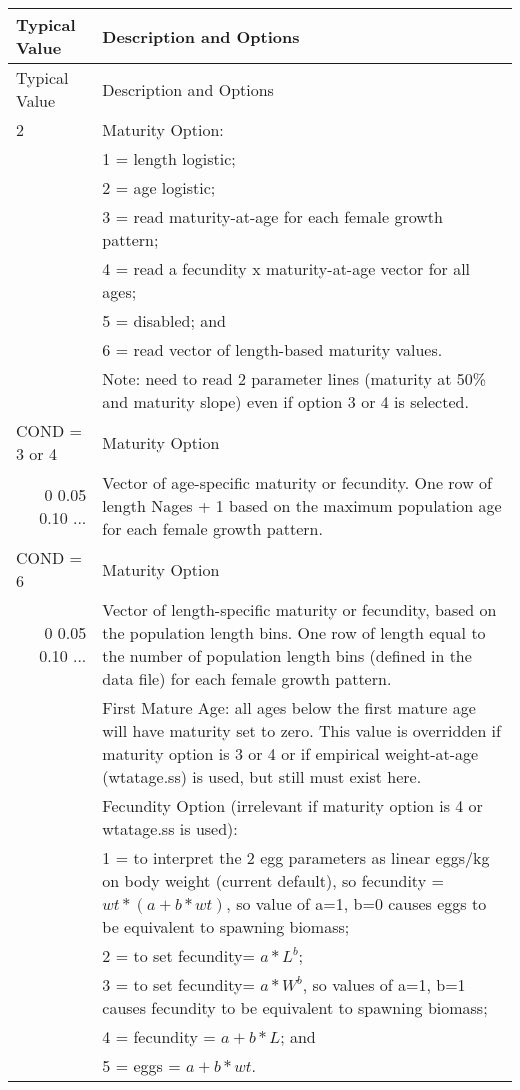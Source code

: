 \begin{longtable}{p{0.5cm} p{2cm} p{13cm}}
	\hline	
	\multicolumn{2}{l}{Typical Value} & Description and Options \Tstrut\Bstrut\\
	\hline
	\endfirsthead

	\hline
	\multicolumn{2}{l}{Typical Value} & Description and Options \Tstrut\Bstrut\\
	\hline
	\endhead
	\hline

	\endfoot
	
	\endlastfoot

	2 & & Maturity Option: \Tstrut\\
	  & & 1 = length logistic; \\
	  & & 2 = age logistic; \\
	  & & 3 = read maturity-at-age for each female growth pattern; \\
	  & & 4 = read a fecundity x maturity-at-age vector for all ages; \\
	  & & 5 = disabled; and \\
	  & & 6 = read vector of length-based maturity values. \\
	  & & Note: need to read 2 parameter lines (maturity at 50\% and maturity slope) even if option 3 or 4 is selected. \Bstrut\\
	\hline

	\multicolumn{2}{l}{COND = 3 or 4} & Maturity Option \Tstrut\\
	\multicolumn{2}{r}{0 0.05 0.10 ...} & Vector of age-specific maturity or fecundity. One row of length Nages + 1 based on the maximum population age for each female growth pattern. \Bstrut\\
	\multicolumn{2}{l}{COND = 6} & Maturity Option \Tstrut\\
	\multicolumn{2}{r}{0 0.05 0.10 ...} & Vector of length-specific maturity or fecundity, based on the population length bins. One row of length equal to the number of population length bins (defined in the data file) for each female growth pattern. \Bstrut\\
	\hline
	
	\Tstrut 1 & & First Mature Age: all ages below the first mature age will have maturity set to zero. This value is overridden if maturity option is 3 or 4 or if empirical weight-at-age (wtatage.ss) is used, but still must exist here. \Bstrut\\
	\hline

	\Tstrut 1 & & Fecundity Option (irrelevant if maturity option is 4 or wtatage.ss is used): \\
	  & & 1 = to interpret the 2 egg parameters as linear eggs/kg on body weight (current default), so fecundity = $wt * (a+b*wt)$, so value of a=1, b=0 causes eggs to be equivalent to spawning biomass; \\
	  & & 2 = to set fecundity= $a*L^ b$; \\
	  & & 3 = to set fecundity= $a*W^ b$, so values of a=1, b=1 causes fecundity to be equivalent to spawning biomass; \\
	  & & 4 = fecundity = $a+b*L$; and \\
	  & & 5 = eggs = $a+b*wt$. \Bstrut\\
	\hline
\end{longtable}

